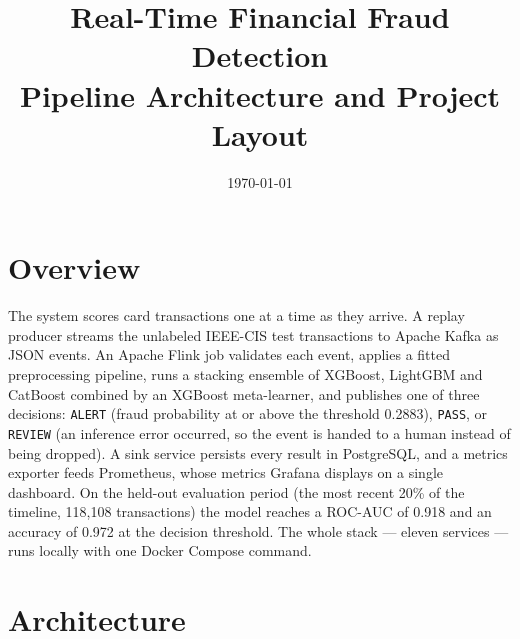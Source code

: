 \documentclass[11pt,a4paper]{article}
\title{Real-Time Financial Fraud Detection\\\large Pipeline Architecture and Project Layout}
\date{\today}
\newcommand{\code}[1]{\texttt{#1}}
\begin{document}
\maketitle

\section{Overview}

The system scores card transactions one at a time as they arrive. A replay
producer streams the unlabeled IEEE-CIS test transactions to Apache Kafka as
JSON events. An Apache Flink job validates each event, applies a fitted
preprocessing pipeline, runs a stacking ensemble of XGBoost, LightGBM and
CatBoost combined by an XGBoost meta-learner, and publishes one of three
decisions: \code{ALERT} (fraud probability at or above the threshold 0.2883),
\code{PASS}, or \code{REVIEW} (an inference error occurred, so the event is
handed to a human instead of being dropped). A sink service persists every
result in PostgreSQL, and a metrics exporter feeds Prometheus, whose metrics
Grafana displays on a single dashboard. On the held-out evaluation period (the
most recent 20\% of the timeline, 118{,}108 transactions) the model reaches a
ROC-AUC of 0.918 and an accuracy of 0.972 at the decision threshold. The whole
stack --- eleven services --- runs locally with one Docker Compose command.

\section{Architecture}
\end{document}
